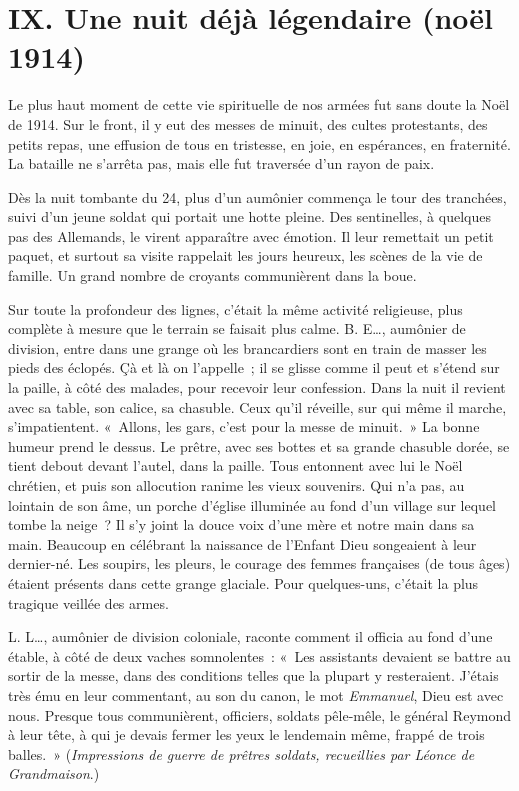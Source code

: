 \documentclass[french,twoside]{book} %
\newcommand\chapteropen{} %
\newcommand\chaptercont{} %
\begin{document}
\chapteropen
\chapter[IX. Une nuit déjà légendaire (noël 1914)‌]{IX. Une nuit déjà légendaire (noël 1914)‌}\renewcommand{\leftmark}{IX. Une nuit déjà légendaire (noël 1914)‌}


\chaptercont
\noindent Le plus haut moment de cette vie spirituelle de nos armées fut sans doute la Noël de 1914. Sur le front, il y eut des messes de minuit, des cultes protestants, des petits repas, une effusion de tous en tristesse, en joie, en espérances, en fraternité. La bataille ne s’arrêta pas, mais elle fut traversée d’un rayon de paix.‌\par
Dès la nuit tombante du 24, plus d’un aumônier commença le tour des tranchées, suivi d’un jeune soldat qui portait une hotte pleine. Des sentinelles, à quelques pas des Allemands, le virent apparaître avec émotion. Il leur remettait un petit paquet, et surtout sa visite rappelait les jours heureux, les scènes de la vie de famille. Un grand nombre de croyants communièrent dans la boue.‌\par
Sur toute la profondeur des lignes, c’était la même activité religieuse, plus complète à mesure que le terrain se faisait plus calme. B. E…, aumônier de division, entre dans une grange où les brancardiers sont en train de masser les pieds des éclopés. Çà et là on l’appelle ; il se glisse comme il peut et s’étend sur la paille, à côté des malades, pour recevoir leur confession. Dans la nuit il revient avec sa table, son calice, sa chasuble. Ceux qu’il réveille, sur qui même il marche, s’impatientent. « Allons, les gars, c’est pour la messe de minuit. » La bonne humeur prend le dessus. Le prêtre, avec ses bottes et sa grande chasuble dorée, se tient debout devant l’autel, dans la paille. Tous entonnent avec lui le Noël chrétien, et puis son allocution ranime les vieux souvenirs. Qui n’a pas, au lointain de son âme, un porche d’église illuminée au fond d’un village sur lequel tombe la neige ? Il s’y joint la douce voix d’une mère et notre main dans sa main. Beaucoup en célébrant la naissance de l’Enfant Dieu songeaient à leur dernier-né. Les soupirs, les pleurs, le courage des femmes françaises (de tous âges) étaient présents dans cette grange glaciale. Pour quelques-uns, c’était la plus tragique veillée des armes.‌\par
L. L…, aumônier de division coloniale, raconte comment il officia au fond d’une étable, à côté de deux vaches somnolentes : « Les assistants devaient se battre au sortir de la messe, dans des conditions telles que la plupart y resteraient. J’étais très ému en leur commentant, au son du canon, le mot {\itshape Emmanuel}, Dieu est avec nous. Presque tous communièrent, officiers, soldats pêle-mêle, le général Reymond à leur tête, à qui je devais fermer les yeux le lendemain même, frappé de trois balles. » ({\itshape Impressions de guerre de prêtres soldats, recueillies par Léonce de Grandmaison}.)‌\par
\end{document}
